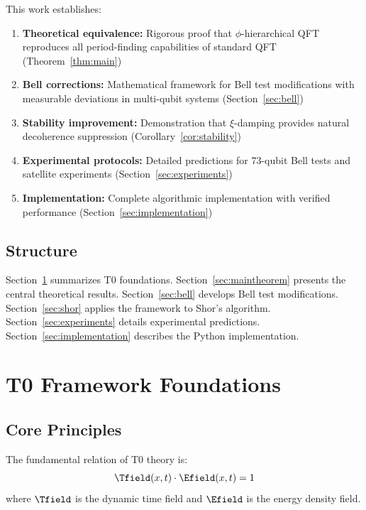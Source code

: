This work establishes:

\begin{enumerate}
	\item \textbf{Theoretical equivalence:} Rigorous proof that $\phi$-hierarchical QFT reproduces all period-finding capabilities of standard QFT (Theorem~\ref{thm:main})
	\item \textbf{Bell corrections:} Mathematical framework for Bell test modifications with measurable deviations in multi-qubit systems (Section~\ref{sec:bell})
	\item \textbf{Stability improvement:} Demonstration that $\xi$-damping provides natural decoherence suppression (Corollary~\ref{cor:stability})
	\item \textbf{Experimental protocols:} Detailed predictions for 73-qubit Bell tests and satellite experiments (Section~\ref{sec:experiments})
	\item \textbf{Implementation:} Complete algorithmic implementation with verified performance (Section~\ref{sec:implementation})
\end{enumerate}

\subsection{Structure}

Section~\ref{sec:t0framework} summarizes T0 foundations. Section~\ref{sec:maintheorem} presents the central theoretical results. Section~\ref{sec:bell} develops Bell test modifications. Section~\ref{sec:shor} applies the framework to Shor's algorithm. Section~\ref{sec:experiments} details experimental predictions. Section~\ref{sec:implementation} describes the Python implementation.

\section{T0 Framework Foundations}
\label{sec:t0framework}

\subsection{Core Principles}

\begin{definition}
	The fundamental relation of T0 theory is:
	\begin{equation}
		\Tfield(x,t) \cdot \Efield(x,t) = 1
		\label{eq:t0duality}
	\end{equation}
	where $\Tfield$ is the dynamic time field and $\Efield$ is the energy density field.
\end{definition}

